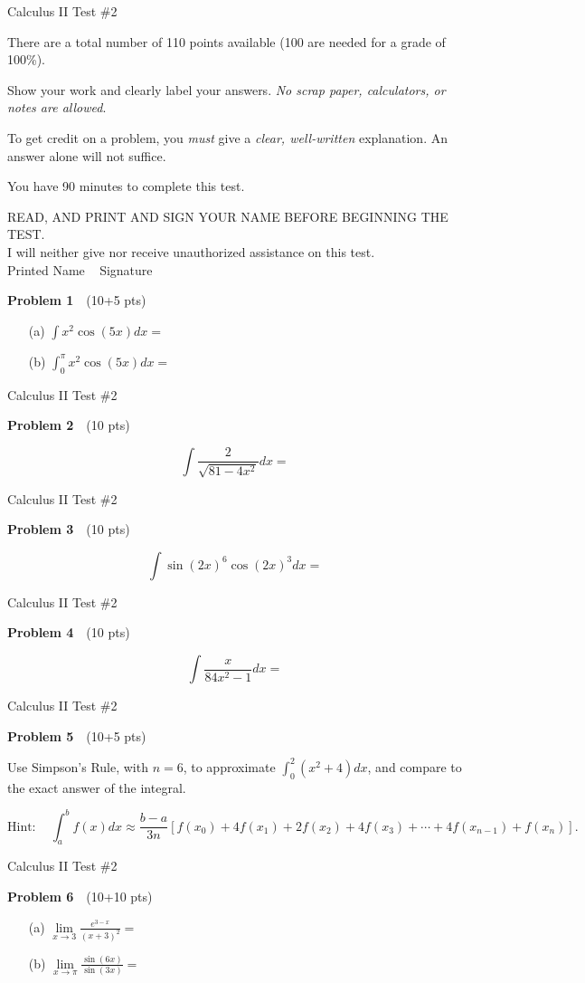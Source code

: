 \documentclass[10pt]{article}
\newcommand{\prob}[1]{\vspace{10mm} \noindent \textbf{Problem #1} \,\,}
\newcommand{\header}{
\begin{center}
Calculus II Test \#2
\end{center}

\vspace{2mm}

}
\newcommand{\intro}{
\noindent There are a total number of 110 points available (100 are needed for a grade of 100\%).

\noindent Show your work and clearly label your answers. \emph{No scrap paper, calculators, or notes are allowed}. 

\noindent To get credit on a problem, you \emph{must} give a \emph{clear, well-written} explanation. An answer alone will not suffice.

\noindent You have 90 minutes to complete this test. 
\bigskip

\noindent READ, AND PRINT AND SIGN YOUR NAME BEFORE BEGINNING THE TEST. \\
I will neither give nor receive unauthorized assistance on this test. \\
Printed Name \underline{\hspace{50mm}} \,\,\, Signature \underline{\hspace{50mm}}
}
\begin{document}


\header

\intro

\vspace{20mm}

\prob{1} (10+5 pts)

\begin{itemize}
\item[(a) ] $\int x^2 \cos(5x) dx = $ \\
\item[(b) ]$\int_0^{\pi} x^2 \cos(5x) dx = $
\end{itemize}

\pagebreak 

\header

\prob{2} (10 pts)

\[ \int \frac{2}{\sqrt{81-4x^2}} dx =  \]

\pagebreak

\header

\prob{3} (10 pts) 

\[ \int \sin(2x)^6 \cos(2x)^3 dx =  \]

\pagebreak

\header

\prob{4} (10 pts) 

\[ \int \frac{x}{84x^2 - 1} dx = \]

\pagebreak

\header

\prob{5} (10+5 pts) 

Use Simpson's Rule, with $n=6$, to approximate $\int_0^2 (x^2 + 4) dx$, and compare to the exact answer of the integral.

\[ \text{Hint: } \,\,\,\,\, \int_a^b f(x) dx \approx \frac{b-a}{3n}[f(x_0) + 4 f(x_1) + 2 f(x_2) + 4 f(x_3) + \cdots + 4 f(x_{n-1}) + f(x_n)]. \]

\pagebreak 

\header

\prob{6} (10+10 pts) 

\begin{itemize}
\item[(a) ] $\lim\limits_{x \to 3} \frac{e^{3-x}}{(x+3)^2} = $
\item[(b) ] $\lim\limits_{x \to \pi} \frac{\sin(6x)}{\sin(3x)} = $
\end{itemize}

\pagebreak
\end{document}
